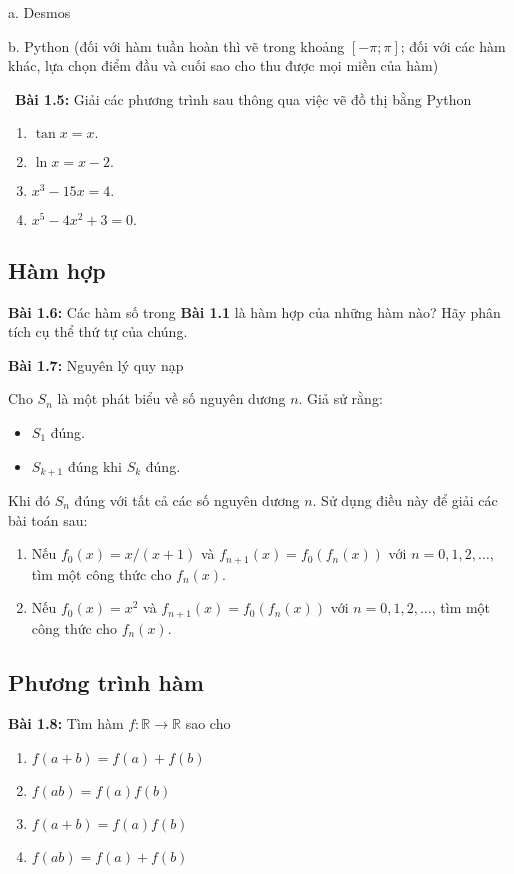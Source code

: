 a. Desmos 
\vspace{5pt}

b. Python (đối với hàm tuần hoàn thì vẽ trong khoảng $[-\pi;\pi]$; đối với các hàm khác, lựa chọn điểm đầu và cuối sao cho thu được mọi miền của hàm)
\vspace{5pt}

\
\textbf{Bài 1.5:} Giải các phương trình sau thông qua việc vẽ đồ thị bằng Python
\begin{enumerate}[label=(\alph*)]
    \item $\tan x= x.$
    \item $\ln x = x-2.$
    \item $x^3 -15x =4.$
    \item $x^5 -4x^2 +3=0.$
\end{enumerate}
\subsection*{Hàm hợp}

\textbf{Bài 1.6:} Các hàm số trong \textbf{Bài 1.1} là hàm hợp của những hàm nào? Hãy phân tích cụ thể thứ tự của chúng.
\vspace{5pt}

\textbf{Bài 1.7:} Nguyên lý quy nạp\newline

Cho $S_n$ là một phát biểu về số nguyên dương $n$. Giả sử rằng:
\begin{itemize}
    \item $S_1$ đúng.
    \item $S_{k+1}$ đúng khi $S_k$ đúng.
\end{itemize}
Khi đó $S_n$ đúng với tất cả các số nguyên dương $n$.\newline
Sử dụng điều này để giải các bài toán sau:
\begin{enumerate}[label=(\alph*)]
    \item Nếu $f_0(x) =x/(x+1)$ và $f_{n+1}(x)=f_0(f_n(x))$ với $n=0, 1, 2,\dots$, tìm một công thức cho $f_n(x)$.
\item Nếu $f_0(x) =x^2$ và $f_{n+1}(x)=f_0(f_n(x))$ với $n=0, 1, 2,\dots$, tìm một công thức cho $f_n(x)$.
\end{enumerate}
\vspace{5pt}
\subsection*{Phương trình hàm}
\textbf{Bài 1.8:} Tìm hàm \(f: \mathbb{R}\rightarrow\mathbb{R}\) sao cho
\begin{enumerate}[label=(\alph*)]
    \item \(f(a+b)=f(a)+f(b)\)
    \item \(f(ab)=f(a)f(b)\)
    \item \(f(a+b)=f(a)f(b)\)
    \item \(f(ab)=f(a)+f(b)\)
\end{enumerate}

